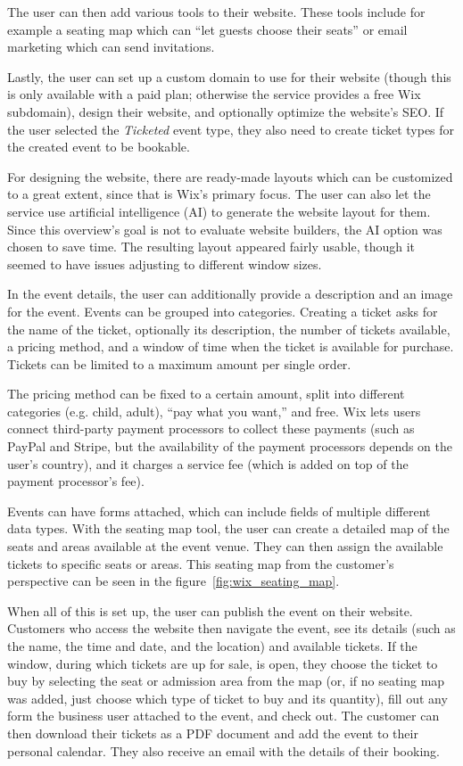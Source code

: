 The user can then add various tools to their website. These tools include for example a seating map which can \enquote{let guests choose their seats} or email marketing which can send invitations.

Lastly, the user can set up a custom domain to use for their website (though this is only available with a paid plan; otherwise the service provides a free Wix subdomain), design their website, and optionally optimize the website's SEO. If the user selected the \textit{Ticketed} event type, they also need to create ticket types for the created event to be bookable.

For designing the website, there are ready-made layouts which can be customized to a great extent, since that is Wix's primary focus. The user can also let the service use artificial intelligence (AI) to generate the website layout for them. Since this overview's goal is not to evaluate website builders, the AI option was chosen to save time. The resulting layout appeared fairly usable, though it seemed to have issues adjusting to different window sizes.

In the event details, the user can additionally provide a description and an image for the event. Events can be grouped into categories. Creating a ticket asks for the name of the ticket, optionally its description, the number of tickets available, a pricing method, and a window of time when the ticket is available for purchase. Tickets can be limited to a maximum amount per single order.

The pricing method can be fixed to a certain amount, split into different categories (e.g. child, adult), \enquote{pay what you want,} and free. Wix lets users connect third-party payment processors to collect these payments (such as PayPal and Stripe, but the availability of the payment processors depends on the user's country), and it charges a service fee (which is added on top of the payment processor's fee).

Events can have forms attached, which can include fields of multiple different data types. With the seating map tool, the user can create a detailed map of the seats and areas available at the event venue. They can then assign the available tickets to specific seats or areas. This seating map from the customer's perspective can be seen in the figure~\ref{fig:wix_seating_map}.

When all of this is set up, the user can publish the event on their website. Customers who access the website then navigate the event, see its details (such as the name, the time and date, and the location) and available tickets. If the window, during which tickets are up for sale, is open, they choose the ticket to buy by selecting the seat or admission area from the map (or, if no seating map was added, just choose which type of ticket to buy and its quantity), fill out any form the business user attached to the event, and check out. The customer can then download their tickets as a PDF document and add the event to their personal calendar. They also receive an email with the details of their booking.

